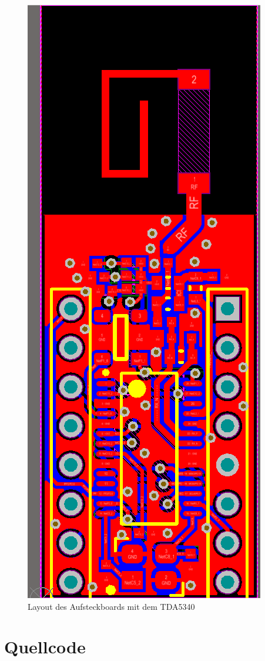 \begin{figure}[h] 
	\centering
	\includegraphics[height=\textwidth, angle=-90 ]{Abbildungen/Aufnahmen/Bilder/Altium/Layout_Stefan_Erhard/Layout.png}
	\caption{Layout des Aufsteckboards mit dem TDA5340}
	\label{fig:AufsteckboardTDA}
\end{figure}

\section{Quellcode}
